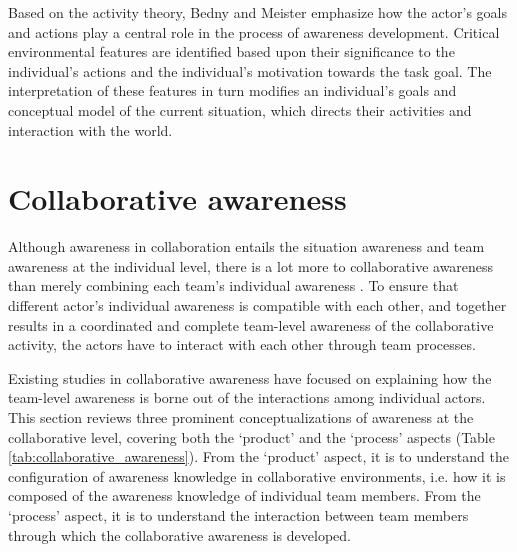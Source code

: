 Based on the activity theory, Bedny and Meister emphasize how the actor's goals and actions play a central role in the process of awareness development. Critical environmental features are identified based upon their significance to the individual's actions and the individual's motivation towards the task goal. The interpretation of these features in turn modifies an individual's goals and conceptual model of the current situation, which directs their activities and interaction with the world.

\section{Collaborative awareness} %
\label{sec:awareness_in_collaboration}
Although awareness in collaboration entails the situation awareness and team awareness at the individual level, there is a lot more to collaborative awareness than merely combining each team's individual awareness \cite{salas1995situation}. To ensure that different actor's individual awareness is compatible with each other, and together results in a coordinated and complete team-level awareness of the collaborative activity, the actors have to interact with each other through team processes.

Existing studies in collaborative awareness have focused on explaining how the team-level awareness is borne out of the interactions among individual actors. This section reviews three prominent conceptualizations of awareness at the collaborative level, covering both the `product' and the `process' aspects (Table \ref{tab:collaborative_awareness}). From the `product' aspect, it is to understand the configuration of awareness knowledge in collaborative environments, i.e. how it is composed of the awareness knowledge of individual team members. From the `process' aspect, it is to understand the interaction between team members through which the collaborative awareness is developed. 

